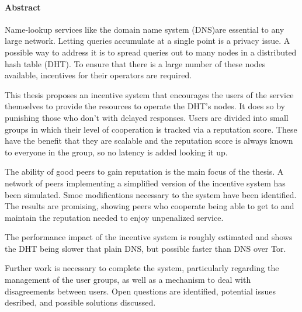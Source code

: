 \cleardoublepage

\begin{center}
\paragraph{Abstract}
\hrulefill
\end{center}
Name-lookup services like the domain name system (DNS)are essential to any large
network. Letting queries accumulate at a single point is a privacy issue. A
possible way to address it is to spread queries out to many nodes in a
distributed hash table (DHT). To ensure that there is a large number of these
nodes available, incentives for their operators are required.

This thesis proposes an incentive system that encourages the users of the
service themselves to provide the resources to operate the DHT's nodes. It does
so by punishing those who don't with delayed responses. Users are divided into
small groups in which their level of cooperation is tracked via a reputation
score. These have the benefit that they are scalable and the reputation score is
always known to everyone in the group, so no latency is added looking it up.

The ability of good peers to gain reputation is the main focus of the thesis. A
network of peers implementing a simplified version of the incentive system has
been simulated. Smoe modifications necessary to the system have been identified.
The results are promising, showing peers who cooperate being able to get to and
maintain the reputation needed to enjoy unpenalized service.

The performance impact of the incentive system is roughly estimated and shows
the DHT being slower that plain DNS, but possible faster than DNS over Tor.

Further work is necessary to complete the system, particularly regarding the
management of the user groups, as well as a mechanism to deal with
disagreements between users. Open questions are identified, potential issues
desribed, and possible solutions discussed.
